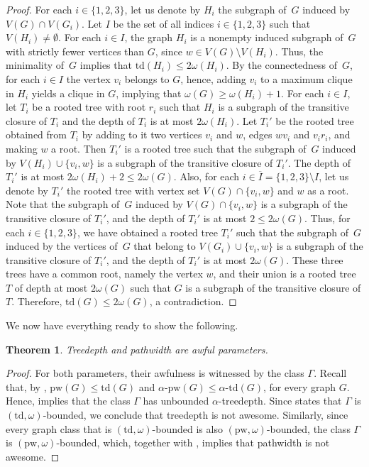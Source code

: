 \documentclass[11pt]{article}
\newcommand{\td}{\mathrm{td}}
\newcommand{\pw}{\mathrm{pw}}
\theoremstyle{plain}
\newtheorem{theorem}{Theorem}[section]
\theoremstyle{definition}
\theoremstyle{remark}
\numberwithin{equation}{section}
\begin{document}
\begin{proof}
For each $i\in \{1,2,3\}$, let us denote by $H_i$ the subgraph of~$G$ induced by $V(G)\cap V(G_i)$.
Let $I$ be the set of all indices $i\in \{1,2,3\}$ such that $V(H_i)\neq \emptyset$.
For each $i\in I$, the graph $H_i$ is a nonempty induced subgraph of~$G$ with strictly fewer vertices than $G$, since $w\in V(G)\setminus V(H_i)$.
Thus, the minimality of~$G$ implies that $\td(H_i)\le 2\omega(H_i)$.
By the connectedness of~$G$, for each $i\in I$ the vertex $v_i$ belongs to $G$, hence, adding $v_i$ to a maximum clique in $H_i$ yields a clique in $G$, implying that $\omega(G)\ge \omega(H_i)+1$.
For each $i\in I$, let $T_i$ be a rooted tree with root $r_i$ such that $H_i$ is a subgraph of the transitive closure of $T_i$ and the depth of $T_i$ is at most $2\omega(H_i)$.
Let $T_i'$ be the rooted tree obtained from $T_i$ by adding to it two vertices $v_i$ and $w$, edges $wv_i$ and $v_ir_i$, and making $w$ a root.
Then $T_i'$ is a rooted tree such that the subgraph of~$G$ induced by $V(H_i)\cup\{v_i,w\}$ is a subgraph of the transitive closure of $T_i'$.
The depth of $T_i'$ is at most $2\omega(H_i)+2\le 2\omega(G)$.
Also, for each $i\in \overline{I} = \{1,2,3\}\setminus I$, let us denote by 
$T_i'$ the rooted tree with vertex set $V(G)\cap \{v_i,w\}$ and $w$ as a root.
Note that the subgraph of~$G$ induced by $V(G)\cap \{v_i,w\}$ is a subgraph of the transitive closure of $T_i'$, and the depth of $T_i'$ is at most $2\le 2\omega(G)$.
Thus, for each $i \in \{1,2,3\}$, we have obtained a rooted tree $T_i'$ such that the subgraph of~$G$ induced by the vertices of~$G$ that belong to $V(G_i)\cup\{v_i,w\}$ is a subgraph of the transitive closure of $T_i'$, and the depth of $T_i'$ is at most $2\omega(G)$.
These three trees have a common root, namely the vertex $w$, and their union is a rooted tree $T$ of depth at most $2\omega(G)$ such that $G$ is a subgraph of the transitive closure of $T$.
Therefore, $\td(G)\le 2\omega(G)$, a contradiction.
\end{proof}

\medskip
We now have everything ready to show the following.

\begin{theorem}\label{tw-pw-awful}
Treedepth and pathwidth are awful parameters.
\end{theorem}

\begin{proof}
For both parameters, their awfulness is witnessed by the class $\Gamma$.
Recall that, by , $\pw(G)\le \td(G)$ and $\alpha\text{-}\pw(G)\le \alpha\text{-}\td(G)$, for every graph $G$.
Hence,  implies that the class $\Gamma$ has unbounded $\alpha$-treedepth.
Since  states that $\Gamma$ is $(\td,\omega)$-bounded, we conclude that treedepth is not awesome.
Similarly, since every graph class that is $(\td,\omega)$-bounded is also $(\pw,\omega)$-bounded, the class $\Gamma$ is $(\pw,\omega)$-bounded, which, together with , implies that pathwidth is not awesome.
\end{proof}
\end{document}
